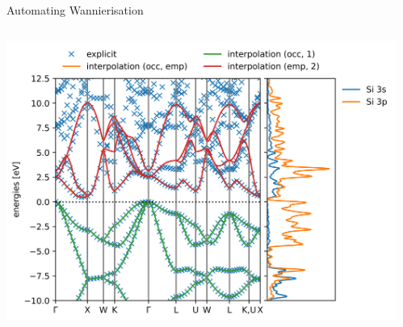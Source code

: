 \documentclass[xcolor=table,aspectratio=169]{beamer}
\numberwithin{equation}{section}
\begin{document}
\begin{frame}{Automating Wannierisation}
   \begin{columns}
      \begin{column}{0.4\textwidth}
         \includegraphics[width=\columnwidth]{figures/vconf_tests/Si/default/51688_wannierization_wannierize_bandstructure.png}
      \end{column}
      \begin{column}{0.6\textwidth}
      \end{column}
   \end{columns}
\end{frame}
\end{document}
